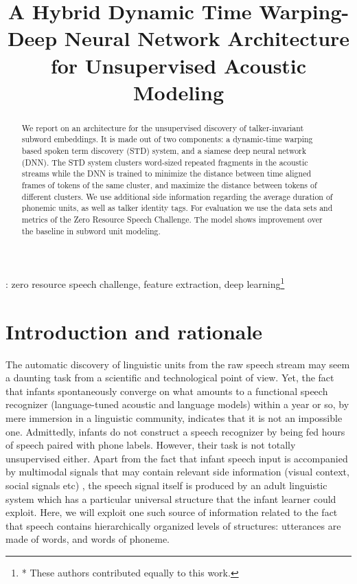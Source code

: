 \documentclass[a4paper]{article}
\title{A Hybrid Dynamic Time Warping-Deep Neural Network Architecture for Unsupervised Acoustic Modeling}
\begin{document}
\maketitle

\begin{abstract}
We report on an architecture for the unsupervised discovery of talker-invariant subword embeddings. It is made out of two components: a dynamic-time warping based spoken term discovery (STD) system, and a siamese deep neural network (DNN). The STD system clusters word-sized repeated fragments in the acoustic streams while the DNN is trained to minimize the distance between time aligned frames of tokens of the same cluster, and maximize the distance between tokens of different clusters. We use additional side information regarding the average duration of phonemic units, as well as talker identity tags. For evaluation we use the data sets and metrics of the Zero Resource Speech Challenge. The model shows improvement over the baseline in subword unit modeling. 
\end{abstract}
: zero resource speech challenge, feature extraction, deep learning\let\thefootnote\relax\footnote{* These authors contributed equally to this work.}


\section{Introduction and rationale}
The automatic discovery of linguistic units from the raw speech stream \cite{} may seem a daunting task from a scientific and technological point of view. Yet, the fact that infants spontaneously converge on what amounts to a functional speech recognizer (language-tuned acoustic and language models) within a year or so, by mere immersion in a linguistic community, indicates that it is not an impossible one. Admittedly, infants do not construct a speech recognizer by being fed hours of speech paired with phone labels. However, their task is not totally unsupervised either. Apart from the fact that infant speech input is accompanied by multimodal signals that may contain relevant side information (visual context, social signals etc) , the speech signal itself is produced by an adult linguistic system which has a particular universal structure  that the infant learner could exploit. Here, we will exploit one  such source of information related to the fact that speech contains hierarchically organized levels of structures: utterances are made of words, and words of phoneme. 
\end{document}
